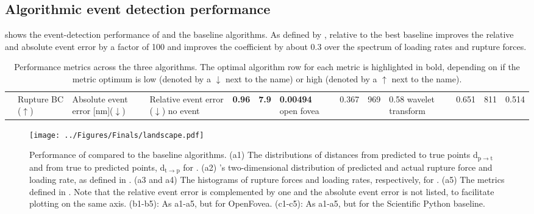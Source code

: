 \subsection{Algorithmic event detection performance}

 shows the event-detection performance of \name{} and the baseline algorithms. As defined by , relative to the best baseline \name{} improves the relative and absolute event error by a factor of 100 and improves the \bc{} coefficient by about 0.3 over the spectrum of loading rates and rupture forces. 

\begin{table}
\begin{tabularx}{\textwidth}{ l || l | l | l }
\hline \hline
 & Rupture BC ($\uparrow$) & Absolute event error [nm]($\downarrow$) & Relative event error ($\downarrow$)\e\hline 
no event & \textbf{0.96} & \textbf{7.9} & \textbf{0.00494}\e
open fovea & 0.367 & 969 & 0.58\e
wavelet transform & 0.651 & 811 & 0.514\e
\end{tabularx}
\caption[Algorithm performance]{ Performance metrics across the three algorithms. The optimal algorithm row for each metric is highlighted in bold, depending on if the metric optimum is low (denoted by a $\downarrow$ next to the name) or high (denoted by a $\uparrow$ next to the name).} 
\end{table}




\begin{figure}
\centering
\texttt{[image: ../Figures/Finals/landscape.pdf]}%
\caption[Algorithm Performance]{\noindent{}\pStartF Performance of \name{} compared to the baseline algorithms. (a1) The distributions of distances from predicted to true points d$_{\mathrm{p}\rightarrow\mathrm{t}}$ and from true to predicted points, d$_{\mathrm{t}\rightarrow\mathrm{p}}$ for \name{}. (a2) \name{}'s two-dimensional distribution of predicted and actual rupture force and loading rate, as defined in . (a3 and a4) The histograms of rupture forces and loading rates, respectively, for \name{}.  (a5) The metrics defined in . Note that the relative event error is complemented by one and the absolute event error is not listed, to facilitate plotting on the same axis. (b1-b5): As a1-a5, but for OpenFovea. (c1-c5): As a1-a5, but for the Scientific Python baseline. \pEndF }
\end{figure}



